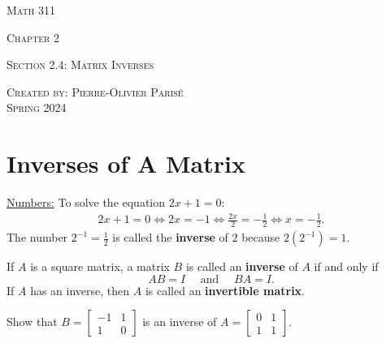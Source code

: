 \documentclass[20pt,a4paper]{extarticle}
\newcounter{example}
\newcounter{definition}
\begin{document}
\thispagestyle{empty}

\begin{center}
\vspace*{2.5cm}

{\Huge \textsc{Math 311}}

\vspace*{1.5cm}

{\LARGE \textsc{Chapter 2}} 

\vspace*{0.75cm}

\noindent\textsc{Section 2.4: Matrix Inverses}

\vspace*{0.75cm}

\tableofcontents

\vfill

\noindent \textsc{Created by: Pierre-Olivier Paris{\'e}} \\
\textsc{Spring 2024}
\end{center}

\newpage

\section{Inverses of A Matrix}

\underline{Numbers:} To solve the equation $2x + 1 = 0$:
	\begin{align*}
	2x + 1 = 0 \iff 2x = -1 \iff \frac{2x}{2} = -\frac{1}{2} \iff x = - \frac{1}{2} .
	\end{align*}
The number $2^{-1} = \frac{1}{2}$ is called the \textbf{inverse} of $2$ because $2 (2^{-1}) = 1$.

\begin{definition}
If $A$ is a square matrix, a matrix $B$ is called an \textbf{inverse} of $A$ if and only if
	\[
		AB = I \quad \text{ and } \quad BA = I .
	\]
If $A$ has an inverse, then $A$ is called an \textbf{invertible matrix}.
\end{definition}

\begin{example}
Show that $B = \begin{bmatrix} -1 & 1 \\ 1 & 0 \end{bmatrix}$ is an inverse of $A = \begin{bmatrix} 0 & 1 \\ 1 & 1 \end{bmatrix}$.
\end{example}
\end{document}
